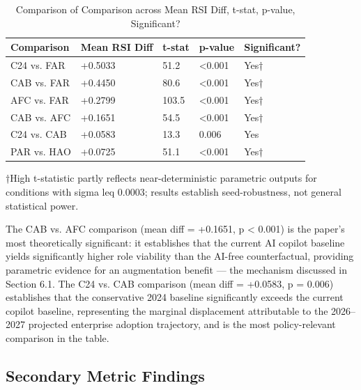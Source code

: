 \documentclass[10pt, conference]{IEEEtran}
\begin{document}
\begin{table}[ht]
\centering
\caption{Comparison of Comparison across Mean RSI Diff, t-stat, p-value, Significant?}
\label{tab:6}
\begin{tabular}{lllll}
\toprule
\textbf{Comparison} & \textbf{Mean RSI Diff} & \textbf{t-stat} & \textbf{p-value} & \textbf{Significant?} \\
\midrule
C24 vs. FAR & +0.5033 & 51.2 & <0.001 & Yes† \\
CAB vs. FAR & +0.4450 & 80.6 & <0.001 & Yes† \\
AFC vs. FAR & +0.2799 & 103.5 & <0.001 & Yes† \\
CAB vs. AFC & +0.1651 & 54.5 & <0.001 & Yes† \\
C24 vs. CAB & +0.0583 & 13.3 & 0.006 & Yes \\
PAR vs. HAO & +0.0725 & 51.1 & <0.001 & Yes† \\
\bottomrule
\end{tabular}
\end{table}

†High t-statistic partly reflects near-deterministic parametric outputs for conditions with sigma leq 0.0003; results establish seed-robustness, not general statistical power.

The CAB vs. AFC comparison (mean diff = +0.1651, p < 0.001) is the paper's most theoretically significant: it establishes that the current AI copilot baseline yields significantly higher role viability than the AI-free counterfactual, providing parametric evidence for an augmentation benefit --- the mechanism discussed in Section 6.1. The C24 vs. CAB comparison (mean diff = +0.0583, p = 0.006) establishes that the conservative 2024 baseline significantly exceeds the current copilot baseline, representing the marginal displacement attributable to the 2026--2027 projected enterprise adoption trajectory, and is the most policy-relevant comparison in the table.

\subsection{Secondary Metric Findings}

\label{sec:secondary\_metric\_findings}
\end{document}
